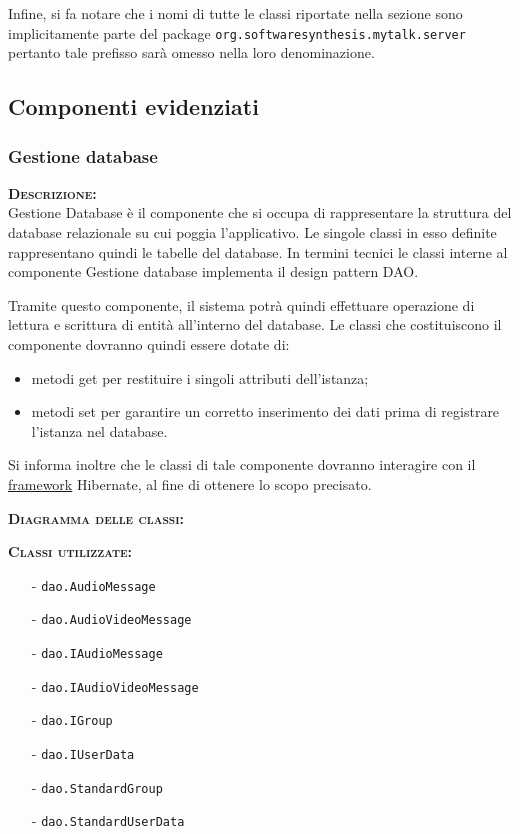 Infine, si fa notare che i nomi di tutte le classi riportate nella sezione sono implicitamente parte del package \texttt{org.softwaresynthesis.mytalk.server} pertanto tale prefisso sarà omesso nella loro denominazione.

\subsection{Componenti evidenziati}

\subsubsection{Gestione database}
\begin{description}
\item{\scshape\bfseries Descrizione:}\\
Gestione Database è il componente che si occupa di rappresentare la struttura del database relazionale su cui poggia l'applicativo. Le singole classi in esso definite rappresentano quindi le tabelle del database. In termini tecnici le classi interne al componente Gestione database implementa il design pattern DAO\@.

Tramite questo componente, il sistema potrà quindi effettuare operazione di lettura e scrittura di entità all'interno del database. Le classi che costituiscono il componente dovranno quindi essere dotate di:

\begin{itemize}
	\item metodi get per restituire i singoli attributi dell'istanza;
	\item metodi set per garantire un corretto inserimento dei dati prima di registrare l'istanza nel database.
\end{itemize}

Si informa inoltre che le classi di tale componente dovranno interagire con il \underline{framework} Hibernate, al fine di ottenere lo scopo precisato.

	\item{\scshape\bfseries Diagramma delle classi:}
	
	\item{\scshape\bfseries Classi utilizzate:}
	\begin{itemize}[nolistsep, noitemsep]
	  \item[-] \texttt{dao.AudioMessage}
	  \item[-] \texttt{dao.AudioVideoMessage}
	  \item[-] \texttt{dao.IAudioMessage}
	  \item[-] \texttt{dao.IAudioVideoMessage}
	  \item[-] \texttt{dao.IGroup}
	  \item[-] \texttt{dao.IUserData}
	  \item[-] \texttt{dao.StandardGroup}
	  \item[-] \texttt{dao.StandardUserData}
	\end{itemize}
\end{description}

